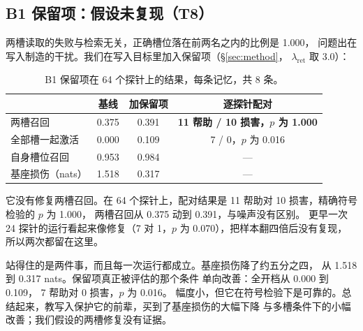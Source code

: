 \documentclass[11pt]{ctexart}
\begin{document}
\subsection{B1 保留项：假设未复现（T8）}
两槽读取的失败与检索无关，正确槽位落在前两名之内的比例是 1.000，
问题出在写入制造的干扰。我们在写入目标里加入保留项（§\ref{sec:method}，
$\lambda_{\mathrm{ret}}$ 取 3.0）：

\begin{table}[h]\centering\small
\begin{tabular}{lccc}\toprule
& 基线 & 加保留项 & 逐探针配对 \\ \midrule
两槽召回 & 0.375 & 0.391 & \textbf{11 帮助 / 10 损害，$p$ 为 1.000} \\
全部槽一起激活 & 0.000 & 0.109 & 7 / 0，$p$ 为 0.016 \\
自身槽位召回 & 0.953 & 0.984 & --- \\
基座损伤（nats） & 1.518 & 0.317 & --- \\ \bottomrule
\end{tabular}
\caption{B1 保留项在 64 个探针上的结果，每条记忆，共 8 条。}
\end{table}

它没有修复两槽召回。在 64 个探针上，配对结果是
11 帮助对 10 损害，精确符号检验的 $p$ 为 1.000，
两槽召回从 0.375 动到 0.391，与噪声没有区别。
更早一次 24 探针的运行看起来像修复（7 对
1，$p$ 为 0.070），把样本翻四倍后没有复现，
所以两次都留在这里。

站得住的是两件事，而且每一次运行都成立。基座损伤降了约五分之四，
从 1.518 到 0.317 nats。保留项真正被评估的那个条件
单向改善：全开档从 0.000 到 0.109，
7 帮助对 0 损害，$p$ 为 0.016。
幅度小，但它在符号检验下是可靠的。总结起来，教写入保护它的前辈，买到了基座损伤的大幅下降
与多槽条件下的小幅改善；我们假设的两槽修复没有证据。
\end{document}
